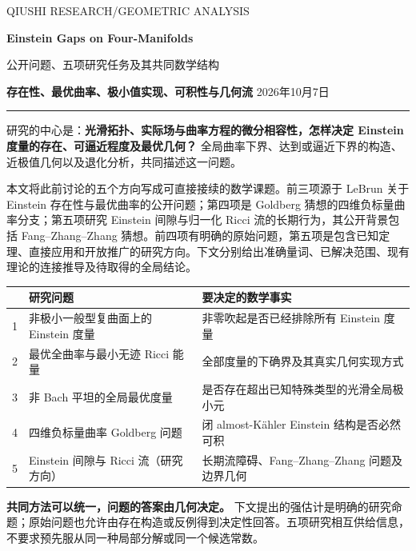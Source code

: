 \documentclass[11pt,a4paper]{article}
\newcommand{\key}[1]{\textbf{\color{ink}#1}}
\newcommand{\Ka}{K{\latin\"a}hler}
\theoremstyle{definition}
\numberwithin{equation}{section}
\begin{document}
\thispagestyle{empty}
{\sffamily\small\color{muted}QIUSHI RESEARCH\quad /\quad GEOMETRIC ANALYSIS}
\vspace{7mm}

{\sffamily\bfseries\LARGE\color{ink}Einstein Gaps on Four-Manifolds}

{\sffamily\Large 公开问题、五项研究任务及其共同数学结构}

\vspace{3mm}
\key{存在性、最优曲率、极小值实现、可积性与几何流}
\hfill 2026年10月7日
\vspace{3mm}\hrule\vspace{4mm}

研究的中心是：\textbf{光滑拓扑、实际场与曲率方程的微分相容性，怎样决定 Einstein 度量的存在、可逼近程度及最优几何？}
全局曲率下界、达到或逼近下界的构造、近极值几何以及退化分析，共同描述这一问题。

本文将此前讨论的五个方向写成可直接接续的数学课题。前三项源于 LeBrun 关于 Einstein 存在性与最优曲率的公开问题；第四项是 Goldberg 猜想的四维负标量曲率分支；第五项研究 Einstein 间隙与归一化 Ricci 流的长期行为，其公开背景包括 Fang--Zhang--Zhang 猜想。前四项有明确的原始问题，第五项是包含已知定理、直接应用和开放推广的研究方向。下文分别给出准确量词、已解决范围、现有理论的连接推导及待取得的全局结论。

\begin{center}
\begin{tabularx}{\textwidth}{@{}p{}p{}Y@{}}
\toprule
 & 研究问题 & 要决定的数学事实\\
 & 非极小一般型复曲面上的 Einstein 度量 & 非零吹起是否已经排除所有 Einstein 度量\\
2 & 最优全曲率与最小无迹 Ricci 能量 & 全部度量的下确界及其真实几何实现方式\\
3 & 非 Bach 平坦的全局最优度量 & 是否存在超出已知特殊类型的光滑全局极小元\\
4 & 四维负标量曲率 Goldberg 问题 & 闭 almost-\Ka{} Einstein 结构是否必然可积\\
5 & Einstein 间隙与 Ricci 流（研究方向） & 长期流障碍、Fang--Zhang--Zhang 问题及边界几何\\
\bottomrule
\end{tabularx}
\end{center}

\textbf{共同方法可以统一，问题的答案由几何决定。} 下文提出的强估计是明确的研究命题；原始问题也允许由存在构造或反例得到决定性回答。五项研究相互供给信息，不要求预先服从同一种局部分解或同一个候选常数。
\end{document}
